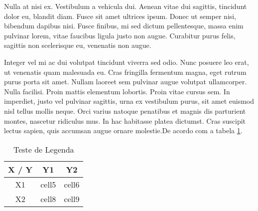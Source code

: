 Nulla at nisi ex. Vestibulum a vehicula dui. Aenean vitae dui sagittis, tincidunt dolor eu, blandit diam. Fusce sit amet ultrices ipsum. Donec ut semper nisi, bibendum dapibus nisi. Fusce finibus, mi sed dictum pellentesque, massa enim pulvinar lorem, vitae faucibus ligula justo non augue. Curabitur purus felis, sagittis non scelerisque eu, venenatis non augue.

Integer vel mi ac dui volutpat tincidunt viverra sed odio. Nunc posuere leo erat, ut venenatis quam malesuada eu. Cras fringilla fermentum magna, eget rutrum purus porta sit amet. Nullam laoreet sem pulvinar augue volutpat ullamcorper. Nulla facilisi. Proin mattis elementum lobortis. Proin vitae cursus sem. In imperdiet, justo vel pulvinar sagittis, urna ex vestibulum purus, sit amet euismod nisl tellus mollis neque. Orci varius natoque penatibus et magnis dis parturient montes, nascetur ridiculus mus. In hac habitasse platea dictumst. Cras suscipit lectus sapien, quis accumsan augue ornare molestie.De acordo com a tabela \ref{tabela1}.

\begin{table}
    \label{tabela1}
    \centering
        \begin{tabular}{|c|c c|}
             \hline
             X / Y & Y1 & Y2 \\ \hline
             X1 & cell5 & cell6 \\
             X2 & cell8 & cell9 \\
             \hline
        \end{tabular}
        \caption{Teste de Legenda}
    \end{table}